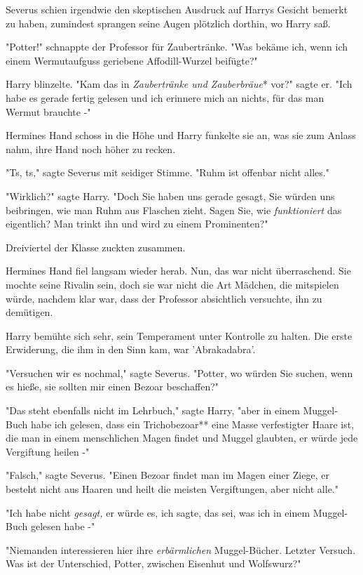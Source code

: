 {Severus schien irgendwie den skeptischen Ausdruck auf Harrys Gesicht bemerkt zu haben, zumindest sprangen seine Augen plötzlich dorthin, wo Harry saß.

"Potter!" schnappte der Professor für Zaubertränke. "Was bekäme ich, wenn ich einem Wermutaufguss geriebene Affodill-Wurzel beifügte?"

Harry blinzelte. "Kam das in \emph{Zaubertränke und Zauberbräue}* vor?" sagte er. "Ich habe es gerade fertig gelesen und ich erinnere mich an nichts, für das man Wermut brauchte -"

Hermines Hand schoss in die Höhe und Harry funkelte sie an, was sie zum Anlass nahm, ihre Hand noch höher zu recken.

"Ts, ts," sagte Severus mit seidiger Stimme. "Ruhm ist offenbar nicht alles."

"Wirklich?" sagte Harry. "Doch Sie haben uns gerade gesagt, Sie würden uns beibringen, wie man Ruhm aus Flaschen zieht. Sagen Sie, wie \emph{funktioniert} das eigentlich? Man trinkt ihn und wird zu einem Prominenten?"

Dreiviertel der Klasse zuckten zusammen.

Hermines Hand fiel langsam wieder herab. Nun, das war nicht überraschend. Sie mochte seine Rivalin sein, doch sie war nicht die Art Mädchen, die mitspielen würde, nachdem klar war, dass der Professor absichtlich versuchte, ihn zu demütigen.

Harry bemühte sich sehr, sein Temperament unter Kontrolle zu halten. Die erste Erwiderung, die ihm in den Sinn kam, war 'Abrakadabra'.

"Versuchen wir es nochmal," sagte Severus. "Potter, wo würden Sie suchen, wenn es hieße, sie sollten mir einen Bezoar beschaffen?"

"Das steht ebenfalls nicht im Lehrbuch," sagte Harry, "aber in einem Muggel-Buch habe ich gelesen, dass ein Trichobezoar** eine Masse verfestigter Haare ist, die man in einem menschlichen Magen findet und Muggel glaubten, er würde jede Vergiftung heilen -"

"Falsch," sagte Severus. "Einen Bezoar findet man im Magen einer Ziege, er besteht nicht aus Haaren und heilt die meisten Vergiftungen, aber nicht alle."

"Ich habe nicht \emph{gesagt,} er würde es, ich sagte, das sei, was ich in einem Muggel-Buch gelesen habe -"

"Niemanden interessieren hier ihre \emph{erbärmlichen} Muggel-Bücher. Letzter Versuch. Was ist der Unterschied, Potter, zwischen Eisenhut und Wolfswurz?"

}

